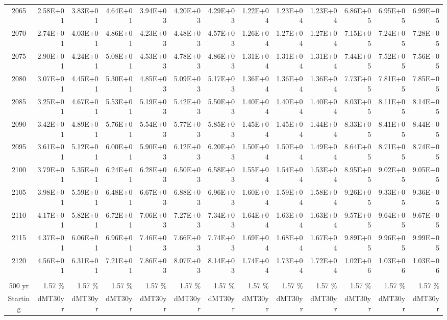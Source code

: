 \documentclass{article}
\begin{document}
\begin{table}
\begin{tabular}{crrr|rrr|rrr|rrr}
2065     & 2.58E+01 & 3.83E+01 & 4.64E+01 & 3.94E+03 & 4.20E+03 & 4.29E+03 & 1.22E+04 & 1.23E+04 & 1.23E+04 & 6.86E+05 & 6.95E+05 & 6.99E+05 \\
2070     & 2.74E+01 & 4.03E+01 & 4.86E+01 & 4.23E+03 & 4.48E+03 & 4.57E+03 & 1.26E+04 & 1.27E+04 & 1.27E+04 & 7.15E+05 & 7.24E+05 & 7.28E+05 \\
2075     & 2.90E+01 & 4.24E+01 & 5.08E+01 & 4.53E+03 & 4.78E+03 & 4.86E+03 & 1.31E+04 & 1.31E+04 & 1.31E+04 & 7.44E+05 & 7.52E+05 & 7.56E+05 \\
2080     & 3.07E+01 & 4.45E+01 & 5.30E+01 & 4.85E+03 & 5.09E+03 & 5.17E+03 & 1.36E+04 & 1.36E+04 & 1.36E+04 & 7.73E+05 & 7.81E+05 & 7.85E+05 \\
2085     & 3.25E+01 & 4.67E+01 & 5.53E+01 & 5.19E+03 & 5.42E+03 & 5.50E+03 & 1.40E+04 & 1.40E+04 & 1.40E+04 & 8.03E+05 & 8.11E+05 & 8.14E+05 \\
2090     & 3.42E+01 & 4.89E+01 & 5.76E+01 & 5.54E+03 & 5.77E+03 & 5.85E+03 & 1.45E+04 & 1.45E+04 & 1.44E+04 & 8.33E+05 & 8.41E+05 & 8.44E+05 \\
2095     & 3.61E+01 & 5.12E+01 & 6.00E+01 & 5.90E+03 & 6.12E+03 & 6.20E+03 & 1.50E+04 & 1.50E+04 & 1.49E+04 & 8.64E+05 & 8.71E+05 & 8.74E+05 \\
2100     & 3.79E+01 & 5.35E+01 & 6.24E+01 & 6.28E+03 & 6.50E+03 & 6.58E+03 & 1.55E+04 & 1.54E+04 & 1.53E+04 & 8.95E+05 & 9.02E+05 & 9.05E+05 \\
2105     & 3.98E+01 & 5.59E+01 & 6.48E+01 & 6.67E+03 & 6.88E+03 & 6.96E+03 & 1.60E+04 & 1.59E+04 & 1.58E+04 & 9.26E+05 & 9.33E+05 & 9.36E+05 \\
2110     & 4.17E+01 & 5.82E+01 & 6.72E+01 & 7.06E+03 & 7.27E+03 & 7.34E+03 & 1.64E+04 & 1.63E+04 & 1.63E+04 & 9.57E+05 & 9.64E+05 & 9.67E+05 \\
2115     & 4.37E+01 & 6.06E+01 & 6.96E+01 & 7.46E+03 & 7.66E+03 & 7.74E+03 & 1.69E+04 & 1.68E+04 & 1.67E+04 & 9.89E+05 & 9.96E+05 & 9.99E+05 \\
2120     & 4.56E+01 & 6.31E+01 & 7.21E+01 & 7.86E+03 & 8.07E+03 & 8.14E+03 & 1.74E+04 & 1.73E+04 & 1.72E+04 & 1.02E+06 & 1.03E+06 & 1.03E+06 \\
         &          &          &          &          &          &          &          &          &          &          &          &          \\ \hline
500 yr   & 1.57 \%  & 1.57 \%  & 1.57 \%  & 1.57 \%  & 1.57 \%  & 1.57 \%  & 1.57 \%  & 1.57 \%  & 1.57 \%  & 1.57 \%  & 1.57 \%  & 1.57 \%  \\
Starting & dMT30yr  & dMT30yr  & dMT30yr  & dMT30yr  & dMT30yr  & dMT30yr  & dMT30yr  & dMT30yr  & dMT30yr  & dMT30yr  & dMT30yr  & dMT30yr  \\

\end{tabular}
\end{table}
\end{document}
